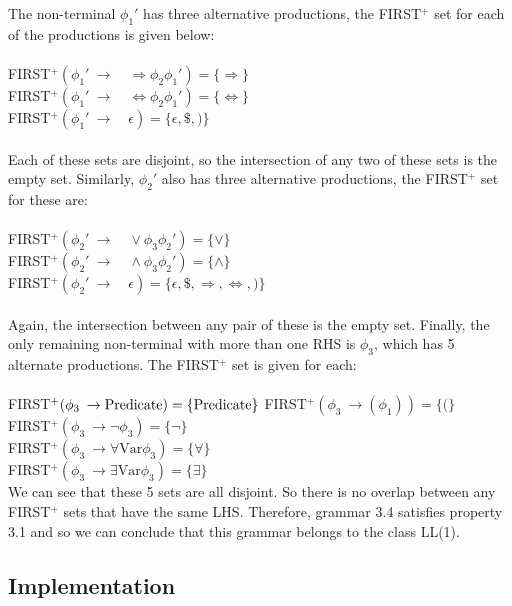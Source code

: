 The non-terminal $\phi_1'$ has three alternative productions, the FIRST$^{+}$ set for each of the productions is given below:\\
\\
FIRST$^{+}(\phi_1' \: \to \quad\Rightarrow \phi_2 \phi_1') = \{\Rightarrow \}$\\
FIRST$^{+}(\phi_1' \: \to \quad\Leftrightarrow \phi_2 \phi_1') = \{\Leftrightarrow \}$\\
FIRST$^{+}(\phi_1' \: \to \quad\epsilon) = \{\epsilon, \$, )\}$\\
\\
Each of these sets are disjoint, so the intersection of any two of these sets is the empty set. Similarly, $\phi_2'$ also has three alternative productions, the FIRST$^{+}$  set for these are:\\
\\
FIRST$^{+}(\phi_2' \: \to \quad\lor \phi_3 \phi_2') = \{\lor \}$\\
FIRST$^{+}(\phi_2' \: \to \quad\land \phi_3 \phi_2') = \{\land \}$\\
FIRST$^{+}(\phi_2' \: \to \quad\epsilon) = \{\epsilon, \$,  \Rightarrow, \Leftrightarrow, )\}$\\
\\
Again, the intersection between any pair of these is the empty set. Finally, the only remaining non-terminal with more than one RHS is $\phi_3$, which has 5 alternate productions. The  FIRST$^{+}$  set is given for each: \\
\\
FIRST$^{+}(\phi_3 \: \to \text{Predicate}) = \{\text{Predicate} \}\\$
FIRST$^{+}(\phi_3 \: \to ( \phi_1 )) = \{( \}$\\
FIRST$^{+}(\phi_3 \: \to \lnot \phi_3 ) = \{\lnot \}$\\
FIRST$^{+}(\phi_3 \: \to \forall \text{Var} \phi_3) = \{\forall\}$\\
FIRST$^{+}(\phi_3 \: \to \exists \text{Var} \phi_3) = \{\exists\}$\\

We can see that these 5 sets are all disjoint. So there is no overlap between any FIRST$^{+}$ sets that have the same LHS. Therefore, grammar 3.4 satisfies property 3.1 and so we can conclude that this grammar belongs to the class LL(1).

\subsection{Implementation}

